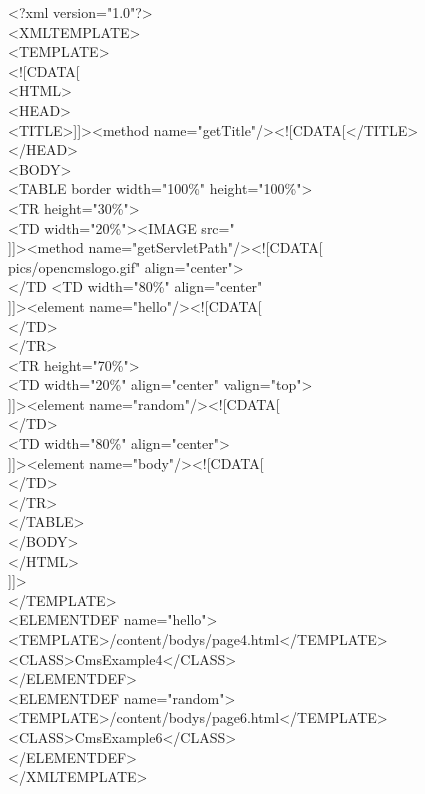 \begin {xml}
<?xml version="1.0"?>\\
<XMLTEMPLATE>\\
<TEMPLATE>\\
<![CDATA[\\
<HTML>\\
<HEAD>\\
<TITLE>]]><method name="getTitle"/><![CDATA[</TITLE>\\
</HEAD>\\
<BODY>\\
<TABLE border width="100\%" height="100\%">\\
\xtaba        <TR height="30\%">\\
\xtabb                <TD width="20\%"><IMAGE src="\\
]]><method name="getServletPath"/><![CDATA[\\
pics/opencmslogo.gif" align="center">\\
</TD
\xtabb                <TD width="80\%" align="center"\\
]]><element name="hello"/><![CDATA[\\
</TD>\\
\xtaba        </TR>\\
\xtaba        <TR height="70\%">\\
\xtabb                <TD width="20\%" align="center" valign="top">\\
\xtabc                        ]]><element name="random"/><![CDATA[\\
\xtabb                </TD>\\
\xtabb                <TD width="80\%" align="center">\\
\xtabb                ]]><element name="body"/><![CDATA[\\
\xtaba        </TD>\\
\xtaba        </TR>\\
</TABLE>\\
</BODY>\\
</HTML>\\
]]>\\
</TEMPLATE>\\

<ELEMENTDEF name="hello">\\
<TEMPLATE>/content/bodys/page4.html</TEMPLATE>\\
<CLASS>CmsExample4</CLASS>\\
</ELEMENTDEF>\\

<ELEMENTDEF name="random">\\
<TEMPLATE>/content/bodys/page6.html</TEMPLATE>\\
<CLASS>CmsExample6</CLASS>\\
</ELEMENTDEF>\\

</XMLTEMPLATE>\\
\end{xml}

